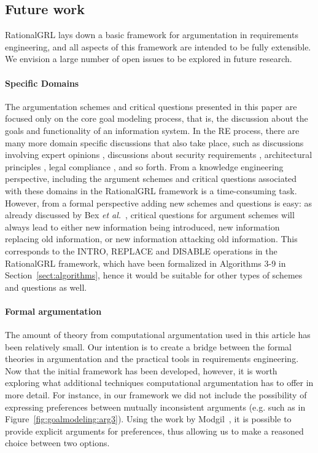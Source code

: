 \subsection{Future work}
\label{sect:discussion:futurework}

RationalGRL lays down a basic framework for argumentation in requirements engineering, and all aspects of this framework are intended to be fully extensible. We envision a large number of open issues to be explored in future research.

\paragraph{Specific Domains}
The argumentation schemes and critical questions presented in this paper are focused only on the core goal modeling process, that is, the discussion about the goals and functionality of an information system. In the RE process, there are many more domain specific discussions that also take place, such as discussions involving expert opinions \cite{murukannaiah2015}, discussions about security requirements \cite{haley2008security,yu2015automated,ionita2014argumentation}, architectural principles \cite{marosin-etal:caise2016}, legal compliance \cite{Ghanavati2013}, and so forth. From a knowledge engineering perspective, including the argument schemes and critical questions associated with these domains in the RationalGRL framework is a time-consuming task. However, from a formal perspective adding new schemes and questions is easy: as already discussed by Bex \emph{et al.}~\cite{bexEtal2003}, critical questions for argument schemes will always lead to either new information being introduced, new information replacing old information, or new information attacking old information. This corresponds to the \textsf{INTRO}, \textsf{REPLACE} and \textsf{DISABLE} operations in the RationalGRL framework, which have been formalized in Algorithms 3-9 in Section~\ref{sect:algorithms}, hence it would be suitable for other types of schemes and questions as well.

\paragraph{Formal argumentation}
The amount of theory from computational argumentation used in this article has been relatively small. Our intention is to create a bridge between the formal theories in argumentation and the practical tools in requirements engineering. Now that the initial framework has been developed, however, it is worth exploring what additional techniques computational argumentation has to offer in more detail. For instance, in our framework we did not include the possibility of expressing preferences between mutually inconsistent arguments (e.g. such as in Figure~\ref{fig:goalmodeling:arg3}). Using the work by Modgil~\cite{modgil2009}, it is possible to provide explicit arguments for preferences, thus allowing us to make a reasoned choice between two options. 

